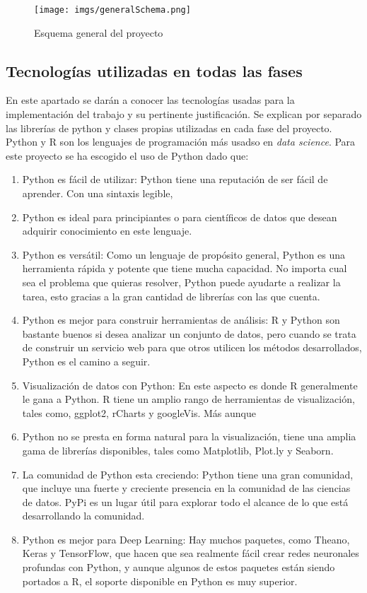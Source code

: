 \documentclass[../all.tex]{subfiles}
\begin{document}
	\begin{figure}[H]
		\centering
		\texttt{[image: imgs/generalSchema.png]}
		\caption{Esquema general del proyecto}
	\end{figure} 
	
\newpage
\subsection{Tecnologías utilizadas en todas las fases}
	En este apartado se darán a conocer las tecnologías usadas para la implementación del trabajo y su pertinente justificación. Se explican por separado las librerías de python y clases propias utilizadas en cada fase del proyecto.\\
	
	Python y R son los lenguajes de programación más usadso en \textit{data science}. Para este proyecto se ha escogido el uso de Python dado que\cite{RvsPython1}\cite{RvsPython2}:
	\begin{enumerate}[resume]
		\setcounter{enumi}{0}
		\item Python es fácil de utilizar:  Python tiene una reputación de ser fácil de aprender. Con una sintaxis legible, \item Python es ideal para principiantes o para científicos de datos que desean adquirir conocimiento en este lenguaje.
		\item Python es versátil: Como un lenguaje de propósito general, Python es una herramienta rápida y potente que tiene mucha capacidad. No importa cual sea el problema que quieras resolver, Python puede ayudarte a realizar la tarea, esto gracias a la gran cantidad de librerías con las que cuenta.
		\item Python es mejor para construir herramientas de análisis: R y Python son bastante buenos si desea analizar un conjunto de datos, pero cuando se trata de construir un servicio web para que otros utilicen los métodos desarrollados, Python es el camino a seguir.
		\item Visualización de datos con Python: En este aspecto es donde R generalmente le gana a Python. R tiene un amplio rango de herramientas de visualización, tales como, ggplot2, rCharts y googleVis. Más aunque \item Python no se presta en forma natural para la visualización, tiene una amplia gama de librerías disponibles, tales como Matplotlib, Plot.ly y Seaborn.
		\item La comunidad de Python esta creciendo: Python tiene una gran comunidad, que incluye una fuerte y creciente presencia en la comunidad de las ciencias de datos. PyPi es un lugar útil para explorar todo el alcance de lo que está desarrollando la comunidad.
		\item Python es mejor para Deep Learning: Hay muchos paquetes, como Theano, Keras y TensorFlow, que hacen que sea realmente fácil crear redes neuronales profundas con Python, y aunque algunos de estos paquetes están siendo portados a R, el soporte disponible en Python es muy superior.
	\end{enumerate}
	\newpage
\end{document}
